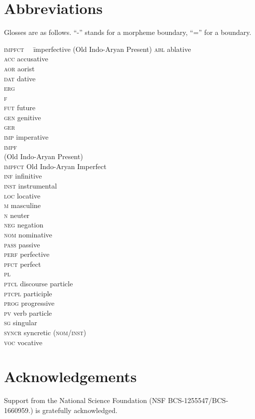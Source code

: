 \documentclass[output=paper,
modfonts
]{LSP/langsci}
\begin{document}
\section*{Abbreviations}
Glosses are as follows.  ``-'' stands  for a   morpheme boundary, ``='' for a  boundary. 
\begin{multicols}{2}
 \begin{tabbing}
 \textsc{impfct}~~ \= imperfective (Old Indo-Aryan Present) \kill
 \textsc{abl} \> ablative\\
 \textsc{acc} \> accusative\\
 \textsc{aor} \> aorist\\
 \textsc{dat} \> dative\\
 \textsc{erg} \> \\
 \textsc{f} \> \\
 \textsc{fut} \> future\\
 \textsc{gen}  \> genitive\\
 \textsc{ger} \> \\
 \textsc{imp} \> imperative\\
 \textsc{impf} \>  \\
	      \>  (Old Indo-Aryan Present)\\
 \textsc{impfct} \> Old Indo-Aryan Imperfect\\
 \textsc{inf} \> infinitive\\
 \textsc{inst} \> instrumental\\
 \textsc{loc} \> locative\\
 \textsc{m} \> masculine\\
 \textsc{n} \> neuter\\
 \textsc{neg}  \> negation\\
 \textsc{nom} \> nominative\\
 \textsc{pass} \> passive\\
 \textsc{perf}  \> perfective\\
 \textsc{pfct} \> perfect\\
 \textsc{pl} \> \\
 \textsc{ptcl} \> discourse  particle\\
 \textsc{ptcpl} \> participle\\
 \textsc{prog} \> progressive\\
 \textsc{pv} \> verb particle\\
 \textsc{sg} \> singular\\
 \textsc{syncr} \> syncretic (\textsc{nom/inst})\\
 \textsc{voc} \> vocative\\
 \end{tabbing}
\end{multicols}

\section*{Acknowledgements}
Support from the National Science Foundation (NSF BCS-1255547/BCS-1660959.) is gratefully acknowledged. 

\printbibliography[heading=subbibliography,notkeyword=this]
\end{document}
